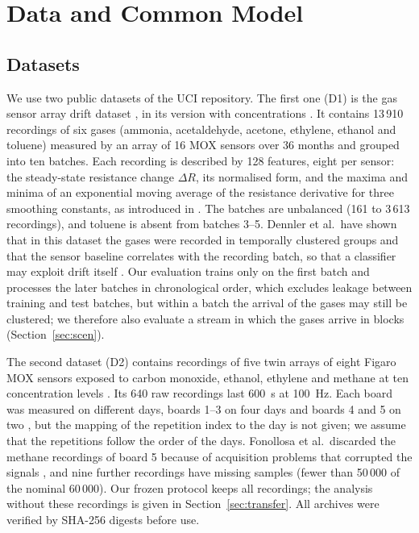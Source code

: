 \documentclass[journal,twoside,web]{ieeecolor}
\begin{document}
\section{Data and Common Model}
\subsection{Datasets}
We use two public datasets of the UCI repository. The first one (D1) is the gas sensor array drift dataset \cite{vergara,rodriguez,uci224}, in its version with concentrations \cite{uci270}. It contains 13\,910 recordings of six gases (ammonia, acetaldehyde, acetone, ethylene, ethanol and toluene) measured by an array of 16 MOX sensors over 36 months and grouped into ten batches. Each recording is described by 128 features, eight per sensor: the steady-state resistance change $\Delta R$, its normalised form, and the maxima and minima of an exponential moving average of the resistance derivative for three smoothing constants, as introduced in \cite{muezzinoglu}. The batches are unbalanced (161 to 3\,613 recordings), and toluene is absent from batches 3--5. Dennler et al.\ have shown that in this dataset the gases were recorded in temporally clustered groups and that the sensor baseline correlates with the recording batch, so that a classifier may exploit drift itself \cite{dennler}. Our evaluation trains only on the first batch and processes the later batches in chronological order, which excludes leakage between training and test batches, but within a batch the arrival of the gases may still be clustered; we therefore also evaluate a stream in which the gases arrive in blocks (Section~\ref{sec:scen}).

The second dataset (D2) contains recordings of five twin arrays of eight Figaro MOX sensors exposed to carbon monoxide, ethanol, ethylene and methane at ten concentration levels \cite{fonollosa,uci361}. Its 640 raw recordings last 600~s at 100~Hz. Each board was measured on different days, boards 1--3 on four days and boards 4 and 5 on two \cite{fonollosa}, but the mapping of the repetition index to the day is not given; we assume that the repetitions follow the order of the days. Fonollosa et al.\ discarded the methane recordings of board 5 because of acquisition problems that corrupted the signals \cite[Sec.~4.3]{fonollosa}, and nine further recordings have missing samples (fewer than 50\,000 of the nominal 60\,000). Our frozen protocol keeps all recordings; the analysis without these recordings is given in Section~\ref{sec:transfer}. All archives were verified by SHA-256 digests before use.
\end{document}

